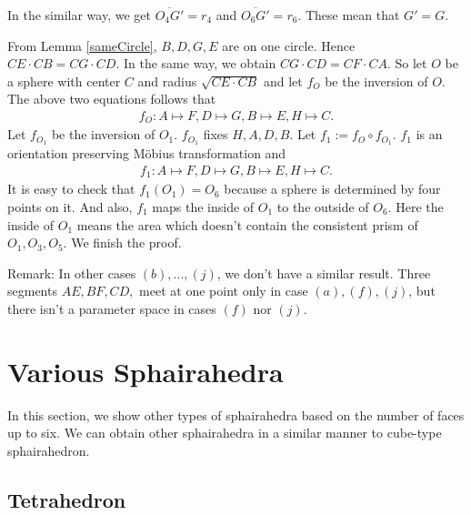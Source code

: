 \documentclass[suppldata, dvipdfmx]{interact}
\theoremstyle{plain}%
\theoremstyle{definition}
\theoremstyle{remark}
\theoremstyle{problemstyle}
\begin{document}
In the similar way, we get $\overline{O_4G'} = r_4$ and 
$\overline{O_6G'} = r_6$. These mean that $G' = G$.

From Lemma \ref{sameCircle}, $B, D, G, E$ are on one circle. Hence
$CE \cdot CB = CG \cdot CD$. In the same way, we obtain 
$CG \cdot CD = CF \cdot CA$. So let $O$ be a sphere with center $C$ and
radius $\sqrt{CE \cdot CB}$ and let $f_O$ be the inversion of $O$.
The above two equations follows that
\begin{align*}
 f_O: A \mapsto F, D \mapsto G, B \mapsto E, H \mapsto C.
\end{align*}
Let $f_{O_1}$ be the inversion of $O_1$. $f_{O_1}$ fixes $H, A, D, B$.
Let $f_1 := f_O \circ f_{O_1}$.
$f_1$ is an orientation preserving M\"obius transformation and
\begin{align*}
 f_1 : A \mapsto F, D \mapsto G, B \mapsto E, H \mapsto C.
\end{align*}
It is easy to check that $f_1(O_1) = O_6$ because a sphere is determined
by four points on it. And also, $f_1$ maps the inside of $O_1$ to the
outside of $O_6$. Here the inside of $O_1$ means the area which doesn't
contain the consistent prism of $O_1, O_3, O_5$. We finish the
proof.

Remark:
In other cases $(b),...,(j)$, we don't have a similar result. Three
segments $AE, BF, CD,$ meet at one point only in case $(a), (f), (j)$, but
there isn't a parameter space in cases $(f)$ nor $(j)$.


\section{Various Sphairahedra}

In this section, we show other types of sphairahedra based on the
number of faces up to six.
We can obtain other sphairahedra in a similar manner to cube-type
sphairahedron.

\subsection{Tetrahedron}
\end{document}
